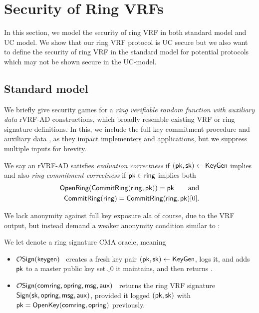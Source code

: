 
\section{Security of Ring VRFs}

In this section, we model the security of ring VRF in both standard model and UC model. We show that our ring VRF protocol is UC secure but we also want to define the security of ring VRF in the standard model for potential protocols which may not be shown secure in the UC-model. 

\subsection{Standard model}
\label{subsec:rvrf_games}

We briefly give security games for a {\em ring verifiable random
function with auxiliary data} rVRF-AD constructions, which broadly
resemble existing VRF or ring signature definitions.  In this,
we include the full key commitment procedure and auxiliary data \aux,
as they impact implementers and applications, but we suppress multiple inputs for brevity.


\begin{definition}
We say an rVRF-AD satisfies {\em evaluation correctness} if
$(\mathsf{pk},\mathsf{sk}) \leftarrow {\ensuremath{\mathsf{KeyGen}}}$ implies
\def\tmpC{\Eval(\sk,\msg) = \Verify(\pk,\msg,\aux,\Sign(\sk,\msg,\aux))}
\eprint{$\tmpC$, succeeds}{$$ \tmpC, $$}
and also {\em ring commitment correctness} if
$\mathsf{pk} \in \mathsf{ring}$ implies both
\def\tmpA{\OpenRing(\CommitRing(\ring,\pk)) = \pk}
\def\tmpB{\CommitRing(\ring) = \CommitRing(\ring,\pk)[0]} 
\eprint{$$ \tmpA \quad\textrm{and}\quad \tmpB \mathperiod $$}%
{$$ \begin{aligned}
   \tmpA \qquad\textrm{and} \\
   \tmpB \mathperiod
\end{aligned} $$}
\end{definition}

We lack anonymity against full key exposure ala
 \cite[pp. 6 Def. 4]{cryptoeprint:2005:304} of course, due to the VRF output,
but instead demand a weaker anonymity condition similar to
 \cite[pp. 5 Def. 3]{cryptoeprint:2005:304}:

\begin{definition}\label{def:rvrf_sign_oracle}
We let  denote a ring signature CMA oracle, meaning
\begin{itemize}
\item $\mathcal{O}\mathsf{Sign}(\mathsf{keygen})$ \, 
 creates a fresh key pair $(\mathsf{pk},\mathsf{sk}) \leftarrow {\ensuremath{\mathsf{KeyGen}}}$, logs it, and
 adds $\mathsf{pk}$ to a master public key set $\ring_0$ it maintains, and then
 returns \pk.
\item $\mathcal{O}\mathsf{Sign}(\mathsf{comring},\mathsf{opring},\mathsf{msg},\mathsf{aux})$ \,
 returns the ring VRF signature ${\mathsf{Sign}}(\mathsf{sk},\mathsf{opring},\mathsf{msg},\mathsf{aux})$,
 provided it logged $(\mathsf{pk},\mathsf{sk})$ with $\mathsf{pk} = {\mathsf{OpenKey}}(\mathsf{comring},\mathsf{opring})$ previously.
\end{itemize}
\end{definition}

